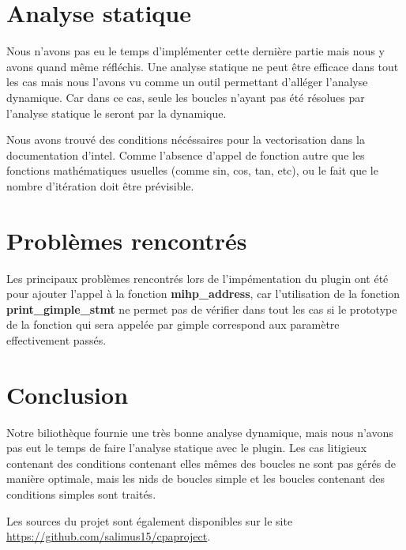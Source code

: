 \documentclass[12pt,french]{article}
\begin{document}
\section{\color{blue}Analyse statique}

Nous n'avons pas eu le temps d'implémenter cette dernière partie mais nous y avons quand même réfléchis. Une analyse statique ne peut être efficace dans tout les cas mais nous l'avons vu comme un outil permettant d'alléger l'analyse dynamique. Car dans ce cas, seule les boucles n'ayant pas été résolues par l'analyse statique le seront par la dynamique.

Nous avons trouvé des conditions nécéssaires pour la vectorisation dans la documentation d'intel. Comme l'absence d'appel de fonction autre que les fonctions mathématiques usuelles (comme sin, cos, tan, etc), ou le fait que le nombre d'itération doit être prévisible.

\section{\color{blue}Problèmes rencontrés}

Les principaux problèmes rencontrés lors de l'impémentation du plugin ont été pour ajouter l'appel à la fonction \textbf{mihp\_address}, car l'utilisation de la fonction \textbf{print\_gimple\_stmt} ne permet pas de vérifier dans tout les cas si le prototype de la fonction qui sera appelée par gimple correspond aux paramètre effectivement passés.

\section{\color{blue}Conclusion}

Notre biliothèque fournie une très bonne analyse dynamique, mais nous n'avons pas eut le temps de faire l'analyse statique avec le plugin. Les cas litigieux contenant des conditions contenant elles mêmes des boucles ne sont pas gérés de manière optimale, mais les nids de boucles simple et les boucles contenant des conditions simples sont traités.

Les sources du projet sont également disponibles sur le site \url{https://github.com/salimus15/cpaproject}.
\end{document}
